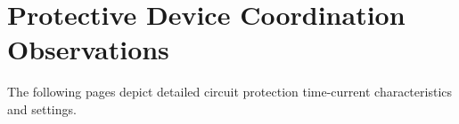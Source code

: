 \section{Protective Device Coordination Observations}
\label{af:pdcobservations}

The following pages depict detailed circuit protection time-current characteristics and settings. 